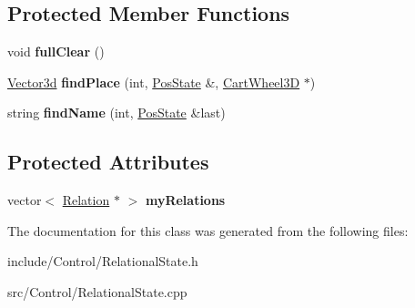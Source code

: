 \subsection*{Protected Member Functions}
\begin{DoxyCompactItemize}
\item 
\hypertarget{classCartWheel_1_1RelationalState_a54bc5b6096c5d48a0a780b68e3c5f2aa}{
void {\bfseries fullClear} ()}
\label{classCartWheel_1_1RelationalState_a54bc5b6096c5d48a0a780b68e3c5f2aa}

\item 
\hypertarget{classCartWheel_1_1RelationalState_ad1da823d416be10d80caaec2ca3a54d3}{
\hyperlink{classCartWheel_1_1Math_1_1Vector3d}{Vector3d} {\bfseries findPlace} (int, \hyperlink{classCartWheel_1_1PosState}{PosState} \&, \hyperlink{classCartWheel_1_1CartWheel3D}{CartWheel3D} $\ast$)}
\label{classCartWheel_1_1RelationalState_ad1da823d416be10d80caaec2ca3a54d3}

\item 
\hypertarget{classCartWheel_1_1RelationalState_aa1967212bf7fb9eb5c5bd7e619d3ae30}{
string {\bfseries findName} (int, \hyperlink{classCartWheel_1_1PosState}{PosState} \&last)}
\label{classCartWheel_1_1RelationalState_aa1967212bf7fb9eb5c5bd7e619d3ae30}

\end{DoxyCompactItemize}
\subsection*{Protected Attributes}
\begin{DoxyCompactItemize}
\item 
\hypertarget{classCartWheel_1_1RelationalState_a0fff42dcf1f71039aab332c895b36f53}{
vector$<$ \hyperlink{classCartWheel_1_1Relation}{Relation} $\ast$ $>$ {\bfseries myRelations}}
\label{classCartWheel_1_1RelationalState_a0fff42dcf1f71039aab332c895b36f53}

\end{DoxyCompactItemize}


The documentation for this class was generated from the following files:\begin{DoxyCompactItemize}
\item 
include/Control/RelationalState.h\item 
src/Control/RelationalState.cpp\end{DoxyCompactItemize}
